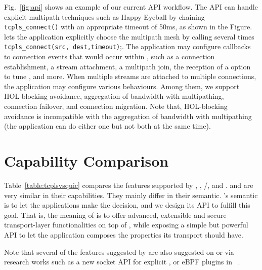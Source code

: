 Fig.~\ref{fig:api} shows an example of our current API workflow. The API can
handle explicit multipath techniques such as Happy Eyeball by chaining
\texttt{tcpls\_connect()} with an appropriate timeout of 50ms, as shown in the
Figure. \tcpls lets the application explicitly choose the multipath mesh by
calling several times \texttt{tcpls\_connect(src, dest,timeout)};. The
application may configure callbacks to connection events that would occur within
\tcpls, such as a connection establishment, a stream attachment, a multipath
join, the reception of a \tcp option to tune \tcp, and more. When multiple
streams are attached to multiple \tcp connections, the application may configure
various \tcpls behaviours. Among them, we support HOL-blocking avoidance,
aggregation of bandwidth with multipathing, connection failover, and connection
migration. Note that, HOL-blocking avoidance is incompatible with the
aggregation of bandwidth with multipathing (the application can do either one
but not both at the same time).


\section{Capability Comparison}


Table~\ref{table:tcplsvsquic} compares the features supported by
\tcp, \mptcp, \tls/\tcp, \quic and \tcpls. \quic and \tcpls are very similar in their
capabilities. They mainly differ in their semantic. \tcpls's semantic is to let
the applications make the decision, and we design its API to fulfill this goal.
That is, the meaning of \tcpls is to offer advanced, extensible and secure
transport-layer functionalities on top of \tcp, while exposing a simple but
powerful API to let the application composes the properties its transport should
have.

Note that several of the features suggested by \tcpls are also suggested on \tcp or \quic via research works such as a new socket API for explicit \mptcp \cite{hesmans2016enhanced}, or eBPF plugins in
\quic~\cite{de2019pluginizing}.

